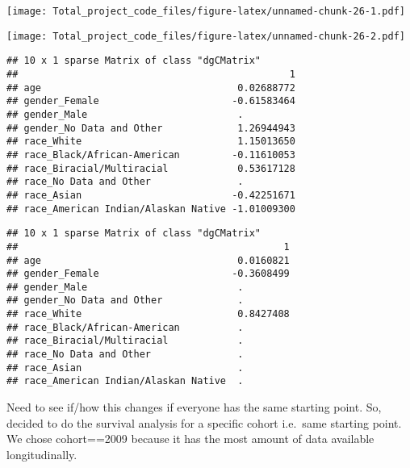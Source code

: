 \documentclass[]{article}
\newenvironment{Shaded}{\begin{snugshade}}{\end{snugshade}}
\newcommand{\KeywordTok}[1]{\textcolor[rgb]{0.13,0.29,0.53}{\textbf{#1}}}
\newcommand{\DataTypeTok}[1]{\textcolor[rgb]{0.13,0.29,0.53}{#1}}
\newcommand{\StringTok}[1]{\textcolor[rgb]{0.31,0.60,0.02}{#1}}
\newcommand{\CommentTok}[1]{\textcolor[rgb]{0.56,0.35,0.01}{\textit{#1}}}
\newcommand{\OperatorTok}[1]{\textcolor[rgb]{0.81,0.36,0.00}{\textbf{#1}}}
\newcommand{\NormalTok}[1]{#1}
\begin{document}
\texttt{[image: Total\_project\_code\_files/figure-latex/unnamed-chunk-26-1.pdf]}

\begin{Shaded}
\end{Shaded}

\texttt{[image: Total\_project\_code\_files/figure-latex/unnamed-chunk-26-2.pdf]}

\begin{Shaded}
\end{Shaded}

\begin{verbatim}
## 10 x 1 sparse Matrix of class "dgCMatrix"
##                                               1
## age                                  0.02688772
## gender_Female                       -0.61583464
## gender_Male                          .         
## gender_No Data and Other             1.26944943
## race_White                           1.15013650
## race_Black/African-American         -0.11610053
## race_Biracial/Multiracial            0.53617128
## race_No Data and Other               .         
## race_Asian                          -0.42251671
## race_American Indian/Alaskan Native -1.01009300
\end{verbatim}

\begin{Shaded}
\end{Shaded}

\begin{verbatim}
## 10 x 1 sparse Matrix of class "dgCMatrix"
##                                              1
## age                                  0.0160821
## gender_Female                       -0.3608499
## gender_Male                          .        
## gender_No Data and Other             .        
## race_White                           0.8427408
## race_Black/African-American          .        
## race_Biracial/Multiracial            .        
## race_No Data and Other               .        
## race_Asian                           .        
## race_American Indian/Alaskan Native  .
\end{verbatim}

Need to see if/how this changes if everyone has the same starting point.
So, decided to do the survival analysis for a specific cohort i.e.~same
starting point. We chose cohort==2009 because it has the most amount of
data available longitudinally.
\end{document}
